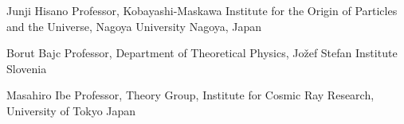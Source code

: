 \cventry
  {Junji Hisano}
  {Professor, Kobayashi-Maskawa Institute for the Origin of Particles and the Universe, Nagoya University}
  {Nagoya, Japan}
  {}
  {}

\cventry
  {Borut Bajc}
  {Professor, Department of Theoretical Physics, Jo\v{z}ef Stefan Institute}
  {Slovenia}
  {}
  {}

\cventry
  {Masahiro Ibe}
  {Professor, Theory Group, Institute for Cosmic Ray Research, University of Tokyo}
  {Japan}
  {}
  {}